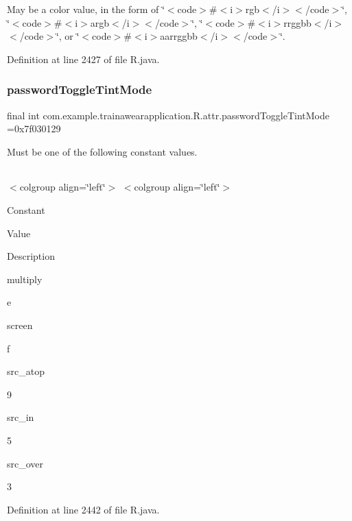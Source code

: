 May be a color value, in the form of \char`\"{}$<$code$>$\#$<$i$>$rgb$<$/i$>$$<$/code$>$\char`\"{}, \char`\"{}$<$code$>$\#$<$i$>$argb$<$/i$>$$<$/code$>$\char`\"{}, \char`\"{}$<$code$>$\#$<$i$>$rrggbb$<$/i$>$$<$/code$>$\char`\"{}, or \char`\"{}$<$code$>$\#$<$i$>$aarrggbb$<$/i$>$$<$/code$>$\char`\"{}. 

Definition at line 2427 of file R.\+java.

\mbox{\label{classcom_1_1example_1_1trainawearapplication_1_1_r_1_1attr_adf540dc55d652d0bbfb3fc17d3c547c4}} 
\subsubsection{\texorpdfstring{passwordToggleTintMode}{passwordToggleTintMode}}
{\footnotesize\ttfamily final int com.\+example.\+trainawearapplication.\+R.\+attr.\+password\+Toggle\+Tint\+Mode =0x7f030129\hspace{0.3cm}{\ttfamily [static]}}

Must be one of the following constant values.

\tabulinesep=1mm
\begin{longtabu}spread 0pt [c]{*{0}{|X[-1]}|}
\hline
\end{longtabu}
$<$colgroup align=\char`\"{}left\char`\"{}$>$ $<$colgroup align=\char`\"{}left\char`\"{}$>$ 

Constant

Value

Description 

multiply

e

screen

f

src\+\_\+atop

9

src\+\_\+in

5

src\+\_\+over

3

Definition at line 2442 of file R.\+java.

\mbox{\label{classcom_1_1example_1_1trainawearapplication_1_1_r_1_1attr_a1cb796186bef2027d1d1a138455631c4}} 
